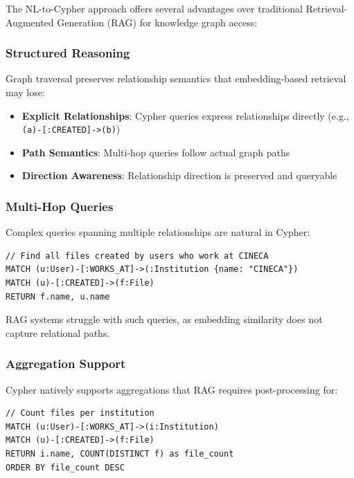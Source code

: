 The NL-to-Cypher approach offers several advantages over traditional Retrieval-Augmented Generation (RAG) for knowledge graph access:

\subsubsection{Structured Reasoning}

Graph traversal preserves relationship semantics that embedding-based retrieval may lose:

\begin{itemize}
    \item \textbf{Explicit Relationships}: Cypher queries express relationships directly (e.g., \texttt{(a)-[:CREATED]->(b)})
    \item \textbf{Path Semantics}: Multi-hop queries follow actual graph paths
    \item \textbf{Direction Awareness}: Relationship direction is preserved and queryable
\end{itemize}

\subsubsection{Multi-Hop Queries}

Complex queries spanning multiple relationships are natural in Cypher:

\begin{lstlisting}[language=cypher, caption={Multi-hop query example}, label=lst:multi-hop]
// Find all files created by users who work at CINECA
MATCH (u:User)-[:WORKS_AT]->(:Institution {name: "CINECA"})
MATCH (u)-[:CREATED]->(f:File)
RETURN f.name, u.name
\end{lstlisting}

RAG systems struggle with such queries, as embedding similarity does not capture relational paths.

\subsubsection{Aggregation Support}

Cypher natively supports aggregations that RAG requires post-processing for:

\begin{lstlisting}[language=cypher, caption={Aggregation query example}, label=lst:aggregation]
// Count files per institution
MATCH (u:User)-[:WORKS_AT]->(i:Institution)
MATCH (u)-[:CREATED]->(f:File)
RETURN i.name, COUNT(DISTINCT f) as file_count
ORDER BY file_count DESC
\end{lstlisting}

